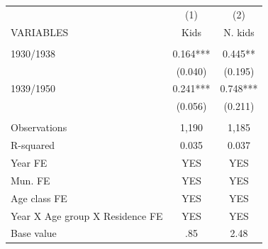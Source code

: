 \begin{tabular}{lcc} \hline
 & (1) & (2) \\
VARIABLES & Kids & N. kids \\ \hline
 &  &  \\
1930/1938 & 0.164*** & 0.445** \\
 & (0.040) & (0.195) \\
1939/1950 & 0.241*** & 0.748*** \\
 & (0.056) & (0.211) \\
 &  &  \\
Observations & 1,190 & 1,185 \\
R-squared & 0.035 & 0.037 \\
Year FE & YES & YES \\
Mun. FE & YES & YES \\
Age class FE & YES & YES \\
Year X Age group X Residence FE & YES & YES \\
 Base value & .85 & 2.48 \\ \hline
\end{tabular}
